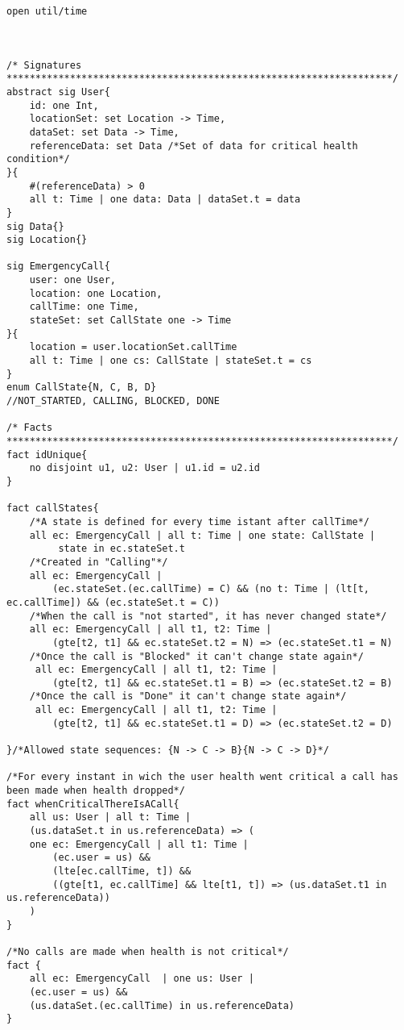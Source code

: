\begin{lstlisting}
open util/time



/* Signatures
*******************************************************************/
abstract sig User{
	id: one Int,
	locationSet: set Location -> Time,
	dataSet: set Data -> Time,
	referenceData: set Data /*Set of data for critical health condition*/
}{
	#(referenceData) > 0
	all t: Time | one data: Data | dataSet.t = data
}
sig Data{}
sig Location{}

sig EmergencyCall{
	user: one User,
	location: one Location,
	callTime: one Time,
	stateSet: set CallState one -> Time
}{
	location = user.locationSet.callTime
	all t: Time | one cs: CallState | stateSet.t = cs
}
enum CallState{N, C, B, D}
//NOT_STARTED, CALLING, BLOCKED, DONE

/* Facts
*******************************************************************/
fact idUnique{
	no disjoint u1, u2: User | u1.id = u2.id
}

fact callStates{
	/*A state is defined for every time istant after callTime*/
	all ec: EmergencyCall | all t: Time | one state: CallState |
		 state in ec.stateSet.t
	/*Created in "Calling"*/
	all ec: EmergencyCall |
		(ec.stateSet.(ec.callTime) = C) && (no t: Time | (lt[t, ec.callTime]) && (ec.stateSet.t = C))
	/*When the call is "not started", it has never changed state*/
	all ec: EmergencyCall | all t1, t2: Time | 
		(gte[t2, t1] && ec.stateSet.t2 = N) => (ec.stateSet.t1 = N)
	/*Once the call is "Blocked" it can't change state again*/
	 all ec: EmergencyCall | all t1, t2: Time | 
		(gte[t2, t1] && ec.stateSet.t1 = B) => (ec.stateSet.t2 = B)
	/*Once the call is "Done" it can't change state again*/
	 all ec: EmergencyCall | all t1, t2: Time | 
		(gte[t2, t1] && ec.stateSet.t1 = D) => (ec.stateSet.t2 = D)
	
}/*Allowed state sequences: {N -> C -> B}{N -> C -> D}*/

/*For every instant in wich the user health went critical a call has been made when health dropped*/
fact whenCriticalThereIsACall{
	all us: User | all t: Time | 
	(us.dataSet.t in us.referenceData) => (
	one ec: EmergencyCall | all t1: Time |
		(ec.user = us) &&
		(lte[ec.callTime, t]) &&
		((gte[t1, ec.callTime] && lte[t1, t]) => (us.dataSet.t1 in us.referenceData))
	)
}

/*No calls are made when health is not critical*/
fact {
	all ec: EmergencyCall  | one us: User | 
	(ec.user = us) &&
	(us.dataSet.(ec.callTime) in us.referenceData)
}


\end{lstlisting}

